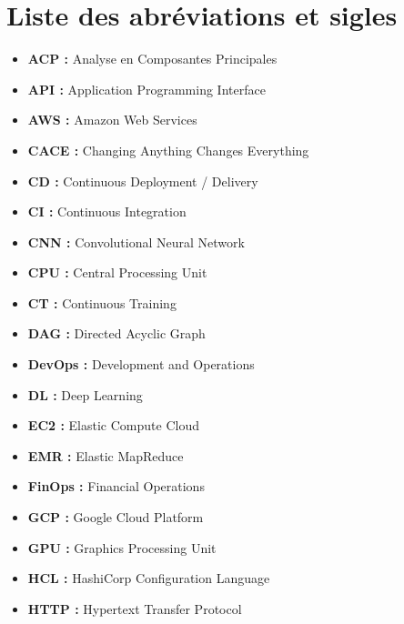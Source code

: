 
\chapter*{Liste des abréviations et sigles}
\label{chap:abreviations}
\adjustmtc

\begin{itemize}
    \item[$\bullet$] \textbf{ACP :} Analyse en Composantes Principales
    \item[$\bullet$] \textbf{API :} Application Programming Interface
    \item[$\bullet$] \textbf{AWS :} Amazon Web Services
    \item[$\bullet$] \textbf{CACE :} Changing Anything Changes Everything
    \item[$\bullet$] \textbf{CD :} Continuous Deployment / Delivery
    \item[$\bullet$] \textbf{CI :} Continuous Integration
    \item[$\bullet$] \textbf{CNN :} Convolutional Neural Network
    \item[$\bullet$] \textbf{CPU :} Central Processing Unit
    \item[$\bullet$] \textbf{CT :} Continuous Training
    \item[$\bullet$] \textbf{DAG :} Directed Acyclic Graph
    \item[$\bullet$] \textbf{DevOps :} Development and Operations
    \item[$\bullet$] \textbf{DL :} Deep Learning
    \item[$\bullet$] \textbf{EC2 :} Elastic Compute Cloud
    \item[$\bullet$] \textbf{EMR :} Elastic MapReduce
    \item[$\bullet$] \textbf{FinOps :} Financial Operations
    \item[$\bullet$] \textbf{GCP :} Google Cloud Platform
    \item[$\bullet$] \textbf{GPU :} Graphics Processing Unit
    \item[$\bullet$] \textbf{HCL :} HashiCorp Configuration Language
    \item[$\bullet$] \textbf{HTTP :} Hypertext Transfer Protocol

\end{itemize}
